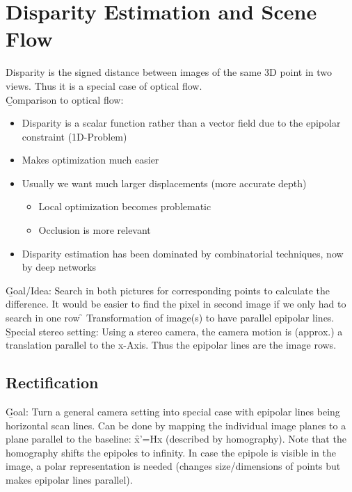 \section{Disparity Estimation and Scene Flow}
Disparity is the signed distance between images of the same 3D point in two views. Thus it is a special case of optical flow.\\

\b{Comparison to optical flow:}
\begin{itemize}
    \item Disparity is a scalar function rather than a vector field due to the epipolar constraint (1D-Problem)
    \item Makes optimization much easier
    \item Usually we want much larger displacements (more accurate depth)
    \begin{itemize}
        \item Local optimization becomes problematic
        \item Occlusion is more relevant
    \end{itemize}
    \item Disparity estimation has been dominated by combinatorial techniques, now by deep networks
\end{itemize}

\b{Goal/Idea:} Search in both pictures for corresponding points to calculate the difference. It would be easier to find the pixel in second image if we only had to search in one row \f{\to} Transformation of image(s) to have parallel epipolar lines.\\

\b{Special stereo setting:} Using a stereo camera, the camera motion is (approx.) a translation parallel to the x-Axis. Thus the epipolar lines are the image rows.

\subsection{Rectification}
\b{Goal:} Turn a general camera setting into special case with epipolar lines being horizontal scan lines. Can be done by mapping the individual image planes to a plane parallel to the baseline: \f{x'=Hx} (described by homography). Note that the homography shifts the epipoles to infinity. In case the epipole is visible in the image, a polar representation is needed (changes size/dimensions of points but makes epipolar lines parallel).\\

